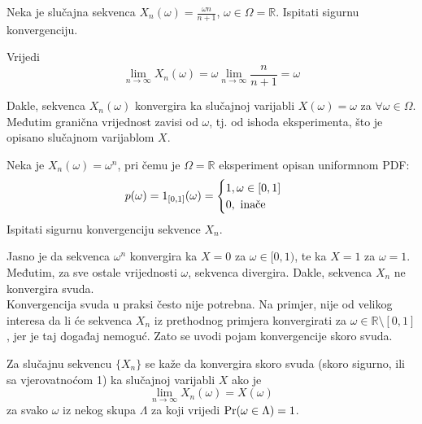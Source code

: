 

\begin{exmp}
  Neka je slučajna sekvenca $X_n(\omega) = \frac{\omega n}{n+1}$, $\omega \in
  \Omega = \mathbb{R}$. Ispitati sigurnu konvergenciju.
\end{exmp}

Vrijedi
\begin{equation}
  \lim_{n\to\infty} X_n(\omega) = \omega \lim_{n\to\infty}\frac{n}{n+1} = \omega
\end{equation}

Dakle, sekvenca $X_n(\omega)$ konvergira ka slučajnoj varijabli $X(\omega) =
\omega$ za $\forall \omega\in\Omega$.  Međutim granična vrijednost zavisi od
$\omega$, tj. od ishoda eksperimenta, što je opisano slučajnom varijablom $X$.

\begin{exmp} \label{ex:converge-surely}
  Neka je $X_n(\omega) = \omega^n$, pri čemu je $\Omega= \mathbb{R}$ eksperiment
  opisan uniformnom PDF:
  $$p(\omega) = 1_{[0,1]}(\omega) = \begin{cases}
      1, \omega \in [0,1]\ \\ 0,\ \text{\normalfont inače}
    \end{cases}
  $$
  Ispitati sigurnu konvergenciju sekvence $X_n$.
\end{exmp}

Jasno je da sekvenca $\omega^n$ konvergira ka $X=0$ za $\omega \in [0,1)$, te ka
$X=1$ za $\omega = 1$. Međutim, za sve ostale vrijednosti $\omega$, sekvenca
divergira. Dakle, sekvenca $X_n$ ne konvergira svuda.\\

Konvergencija svuda u praksi često nije potrebna. Na primjer, nije od
velikog interesa da li će sekvenca $X_n$ iz prethodnog primjera konvergirati za
$\omega \in \mathbb{R}\setminus[0,1]$, jer je taj događaj nemoguć. Zato se uvodi
pojam konvergencije skoro svuda.

\begin{definition}
  Za slučajnu sekvencu $\{X_n\}$ se kaže da konvergira skoro svuda (skoro
  sigurno, ili sa vjerovatnoćom 1) ka slučajnoj varijabli $X$ ako je
  \begin{equation}
    \lim_{n\to\infty} X_n(\omega) = X(\omega)
  \end{equation}
  za svako $\omega$ iz nekog skupa $\Lambda$ za koji vrijedi
  $\mathrm{Pr}(\omega\in\Lambda)=1$.
\end{definition}

